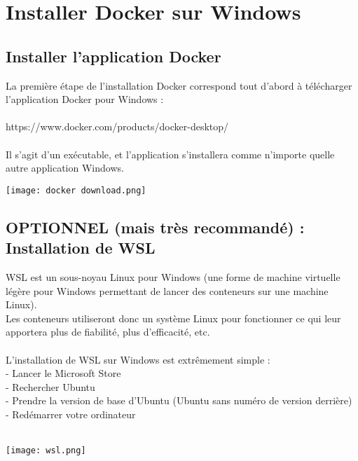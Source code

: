 \documentclass{article}
\begin{document}
    \newpage
    \section{Installer Docker sur Windows}

    \subsection{Installer l'application Docker}
    La première étape de l'installation Docker correspond tout d'abord à télécharger l'application Docker pour Windows :\\\\
    https://www.docker.com/products/docker-desktop/\\\\
    Il s'agit d'un exécutable, et l'application s'installera comme n'importe quelle autre application Windows.

    \begin{center}
        \texttt{[image: docker download.png]}
    \end{center}

    \subsection{OPTIONNEL (mais très recommandé) : Installation de WSL}
    WSL est un sous-noyau Linux pour Windows (une forme de machine virtuelle légère pour Windows permettant de lancer des conteneurs sur une machine Linux).\\
    Les conteneurs utiliseront donc un système Linux pour fonctionner ce qui leur apportera plus de fiabilité, plus d'efficacité, etc.\\\\

    L'installation de WSL sur Windows est extrêmement simple : \\
    \indent- Lancer le Microsoft Store\\
    \indent- Rechercher Ubuntu\\
    \indent- Prendre la version de base d'Ubuntu (Ubuntu sans numéro de version derrière)\\
    \indent- Redémarrer votre ordinateur\\\\

    \begin{center}
        \texttt{[image: wsl.png]}
    \end{center}
\end{document}

